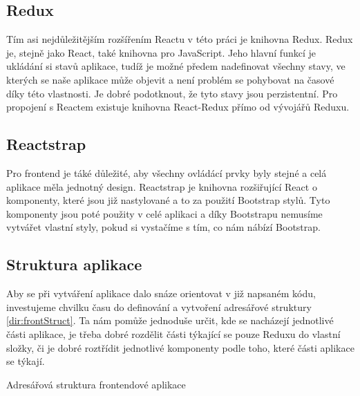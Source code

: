 \subsection{Redux}

Tím asi nejdůležitějším rozšířením Reactu v této práci je knihovna Redux. Redux je, stejně jako React, také knihovna pro JavaScript. Jeho hlavní funkcí je
ukládání si stavů aplikace, tudíž je možné předem nadefinovat všechny stavy, ve kterých se naše aplikace může objevit a není problém se pohybovat na časové
díky této vlastnosti. Je dobré podotknout, že tyto stavy jsou perzistentní. Pro propojení s Reactem existuje knihovna React-Redux přímo od vývojářů Reduxu. \cite{redux}

\subsection{Reactstrap}

Pro frontend je táké důležité, aby všechny ovládácí prvky byly stejné a celá aplikace měla jednotný design. Reactstrap je knihovna rozšiřující React o komponenty,
které jsou již nastylované a to za použití Bootstrap stylů. Tyto komponenty jsou poté použity v celé aplikaci a díky Bootstrapu nemusíme vytvářet vlastní styly,
pokud si vystačíme s tím, co nám nábízí Bootstrap.

\subsection{Struktura aplikace}

Aby se při vytváření aplikace dalo snáze orientovat v již napsaném kódu, investujeme chvilku času do definování a vytvoření adresářové struktury \ref{dir:frontStruct}. Ta nám
pomůže jednoduše určit, kde se nacházejí jednotlivé části aplikace, je třeba dobré rozdělit části týkající se pouze Reduxu do vlastní složky, či je dobré roztřídit
jednotlivé komponenty podle toho, které části aplikace se týkají.

\begin{listing}[H]
    \caption{Adresářová struktura frontendové aplikace}
    \label{dir:frontStruct}
\end{listing}